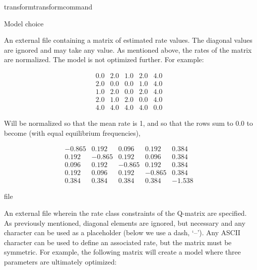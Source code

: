 \begin{command}{transform}{transformcommand}
\begin{arguments}
\begin {argumentgroup} {Model choice}
                        {An external file containing a matrix of estimated rate
                        values. The diagonal values are ignored and may take any
                        value. As mentioned above, the rates of the matrix are
                        normalized. The model is not optimized further. For example:
 
                        \begin{equation*}
                            \begin{array}{ccccc}
                                0.0 & 2.0 & 1.0 & 2.0 & 4.0 \\
                                2.0 & 0.0 & 0.0 & 1.0 & 4.0 \\
                                1.0 & 2.0 & 0.0 & 2.0 & 4.0 \\
                                2.0 & 1.0 & 2.0 & 0.0 & 4.0 \\
                                4.0 & 4.0 & 4.0 & 4.0 & 0.0
                             \end{array}
                        \end{equation*} 

                        Will be normalized so that the mean rate is 1, and so
                        that the rows sum to 0.0 to become (with equal equilibrium
                        frequencies),

                        \begin{equation*}
                            \begin{array}{rrrrr}
                                -0.865 &  0.192 &  0.096 &  0.192 &  0.384 \\
                                 0.192 & -0.865 &  0.192 &  0.096 &  0.384 \\
                                 0.096 &  0.192 & -0.865 &  0.192 &  0.384 \\
                                 0.192 &  0.096 &  0.192 & -0.865 &  0.384 \\
                                 0.384 &  0.384 &  0.384 &  0.384 & -1.538
                             \end{array}
                        \end{equation*} }
                        {file}

                        {An external file wherein the rate class constraints of
                        the Q-matrix are specified. As previously mentioned,
                        diagonal elements are ignored, but necessary and any character can
                        be used as a placeholder (below we use a dash, `--'). Any
                        ASCII character can be used to define an associated
                        rate, but the matrix must be symmetric. For example, the
                        following matrix will create a model where three
                        parameters are ultimately optimized:

}
\end{argumentgroup}
\end{arguments}
\end{command}
